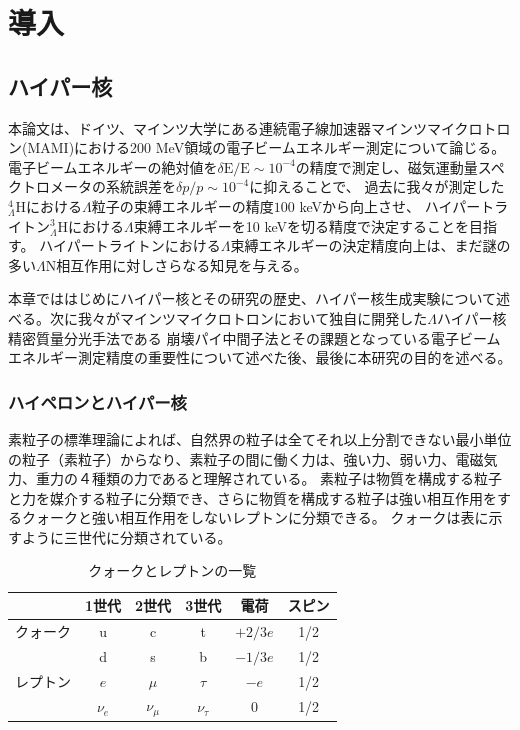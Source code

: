 \documentclass[a4paper,11pt,uplatex]{jsbook}
\begin{document}
\chapter{導入}
\section{ハイパー核}
本論文は、ドイツ、マインツ大学にある連続電子線加速器マインツマイクロトロン(MAMI)における200 MeV領域の電子ビームエネルギー測定について論じる。
電子ビームエネルギーの絶対値を$\delta \text{E}/\text{E} \sim 10^{-4}$の精度で測定し、磁気運動量スペクトロメータの系統誤差を$\delta p/p \sim 10^{-4}$に抑えることで、
過去に我々が測定した$^4_{\Lambda} \text{H}$における$\Lambda$粒子の束縛エネルギーの精度$100$ keVから向上させ、
ハイパートライトン$^3_{\Lambda}\text{H}$における$\Lambda$束縛エネルギーを10 keVを切る精度で決定することを目指す。
ハイパートライトンにおける$\Lambda$束縛エネルギーの決定精度向上は、まだ謎の多い$\Lambda$N相互作用に対しさらなる知見を与える。

本章でははじめにハイパー核とその研究の歴史、ハイパー核生成実験について述べる。次に我々がマインツマイクロトロンにおいて独自に開発した$\Lambda$ハイパー核精密質量分光手法である
崩壊パイ中間子法とその課題となっている電子ビームエネルギー測定精度の重要性について述べた後、最後に本研究の目的を述べる。

\subsection{ハイペロンとハイパー核}
素粒子の標準理論によれば、自然界の粒子は全てそれ以上分割できない最小単位の粒子（素粒子）からなり、素粒子の間に働く力は、強い力、弱い力、電磁気力、重力の４種類の力であると理解されている。
素粒子は物質を構成する粒子と力を媒介する粒子に分類でき、さらに物質を構成する粒子は強い相互作用をするクォークと強い相互作用をしないレプトンに分類できる。
クォークは表に示すように三世代に分類されている。
\begin{table}[ht]
\centering
\begin{tabular}{|c||c|c|c||c|c|}
  \hline
  & 1世代 & 2世代 & 3世代 & 電荷 & スピン\\
  \hline\hline
  クォーク & u & c & t & $+2/3e$ & 1/2\\
  & d & s & b & $-1/3e$ & 1/2\\ \hline
  レプトン & $e$& $\mu$& $\tau$& $-e$& 1/2\\
  &$\nu_e$ & $\nu_\mu$& $\nu_\tau$& 0 & 1/2\\
  \hline
\end{tabular}
\caption{クォークとレプトンの一覧}
\end{table}
\end{document}
